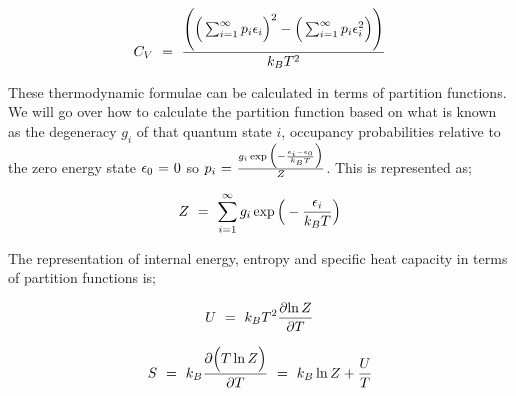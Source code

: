 \documentclass{article}
\begin{document}
\begin{equation} \label{eq:256}
C_V \hspace{0.125cm} = \hspace{0.125cm} \frac{\Bigg(\Big( \sum_{i = 1}^{\infty} p_i \epsilon_i \Big)^2 - \Big( \sum_{i = 1}^{\infty} p_i \epsilon_{i}^{2}\Big) \Bigg)}{k_B T^2}
\end{equation}

These thermodynamic formulae can be calculated in terms of partition functions. We will go over how to calculate the partition function based on what is known as the degeneracy \begin{math} g_i \end{math} of that quantum state \begin{math} i \end{math}, occupancy probabilities relative to the zero energy state \begin{math} \epsilon_0 \hspace{0.025cm} = \hspace{0.025cm}  0 \end{math} so \begin{math} p_i \hspace{0.025cm} = \hspace{0.025cm} \frac{g_i \exp{\Big(-\frac{\epsilon_i - \epsilon_0}{k_B T} \Big)}}{Z} \end{math}. This is represented as;

\begin{equation} \label{eq:256}
Z \hspace{0.125cm} = \hspace{0.125cm} \sum_{i = 1}^{\infty} g_i \exp{\Big(-\frac{\epsilon_i}{k_B T} \Big)}
\end{equation}

The representation of internal energy, entropy and specific heat capacity in terms of partition functions is;


\begin{equation} \label{eq:256}
U \hspace{0.125cm} = \hspace{0.125cm} k_B T^2 \frac{\partial{\ln{Z}}}{\partial{T}}
\end{equation}

\begin{equation} \label{eq:256}
S \hspace{0.125cm} = \hspace{0.125cm} k_B \frac{\partial{\Big( T \ln{Z}} \Big)}{\partial{T}} \hspace{0.125cm} = \hspace{0.125cm} k_B \ln{Z} + \frac{U}{T}
\end{equation}
\end{document}
